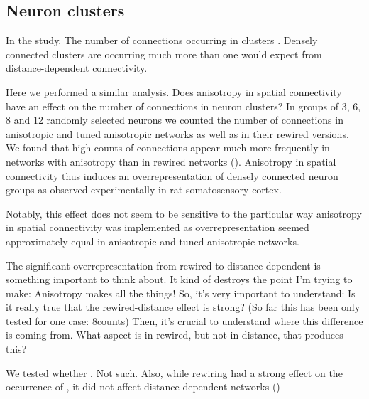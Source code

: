 \clearpage
\pagebreak
\newpage

\subsection*{Neuron clusters}

In the study. The number of connections occurring in clusters
. Densely connected clusters are occurring much more than one would
expect from distance-dependent connectivity.

Here we performed a similar analysis. Does anisotropy in spatial
connectivity have an effect on the number of connections in neuron
clusters? In groups of 3, 6, 8 and 12 randomly selected neurons we
counted the number of connections in anisotropic and tuned anisotropic
networks as well as in their rewired versions. We found that high
counts of connections appear much more frequently in networks with
anisotropy than in rewired networks
(). Anisotropy in spatial connectivity
thus induces an overrepresentation of densely connected neuron groups
as observed experimentally in rat somatosensory cortex.




Notably, this effect does not seem to be sensitive to the particular
way anisotropy in spatial connectivity was implemented as
overrepresentation seemed approximately equal in anisotropic and tuned
anisotropic networks. 



The significant overrepresentation from rewired to distance-dependent
is something important to think about. It kind of destroys the point
I'm trying to make: Anisotropy makes all the things! So, it's very
important to understand: Is it really true that the rewired-distance
effect is strong? (So far this has been only tested for one case:
8counts) Then, it's crucial to understand where this difference is
coming from. What aspect is in rewired, but not in distance, that
produces this?

We tested whether . Not such. Also, while rewiring had a strong effect
on the occurrence of , it did not affect distance-dependent networks
()
